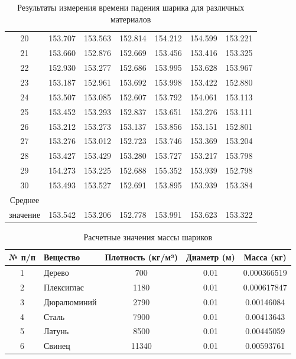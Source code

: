 \begin{table}[h!]
\begin{tabular}{|c|c|c|c|c|c|c|}
20 & 153.707 & 153.563 & 152.814 & 154.212 & 154.599 & 153.221 \\
21 & 153.660 & 152.876 & 152.669 & 153.456 & 153.416 & 153.325 \\
22 & 152.930 & 153.277 & 152.686 & 153.995 & 153.628 & 153.967 \\
23 & 153.187 & 152.961 & 153.692 & 153.998 & 153.422 & 152.880 \\
24 & 153.507 & 153.085 & 152.607 & 153.792 & 154.061 & 153.113 \\
25 & 153.452 & 153.293 & 152.837 & 153.651 & 153.276 & 153.111 \\
26 & 153.212 & 153.273 & 153.137 & 153.856 & 153.151 & 152.801 \\
27 & 153.276 & 153.012 & 152.723 & 153.746 & 153.369 & 153.204 \\
28 & 153.427 & 153.429 & 153.280 & 153.727 & 153.217 & 153.798 \\
29 & 154.273 & 153.225 & 152.688 & 155.352 & 153.939 & 152.798 \\
30 & 153.493 & 153.527 & 152.691 & 153.895 & 153.939 & 153.384 \\
Среднее \\ значение & 153.542 & 153.206 & 152.778 & 153.991 & 153.623 & 153.322 \\
\hline
\end{tabular}
\caption{Результаты измерения времени падения шарика для различных материалов}
\end{table}


\begin{table}[htbp]
  \centering
  \label{tab:masses}
  \begin{tabular}{|c|l|c|c|c|}
    \hline
    № п/п & Вещество & Плотность (кг/м³) & Диаметр (м) & Масса (кг) \\
    \hline
    1 & Дерево & 700 & 0.01 & 0.000366519 \\
    2 & Плексиглас & 1180 & 0.01 & 0.000617847 \\
    3 & Дюралюминий & 2790 & 0.01 & 0.00146084 \\
    4 & Сталь & 7900 & 0.01 & 0.00413643 \\
    5 & Латунь & 8500 & 0.01 & 0.00445059 \\
    6 & Свинец & 11340 & 0.01 & 0.00593761 \\
    \hline
  \end{tabular}
\caption{Расчетные значения массы шариков}
\end{table}

